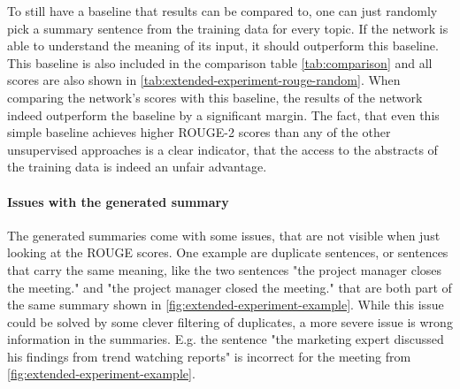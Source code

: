 To still have a baseline that results can be compared to, one can just randomly pick a summary sentence from the training data for every topic.
If the network is able to understand the meaning of its input, it should outperform this baseline.
This baseline is also included in the comparison table \cref{tab:comparison} and all scores are also shown in \cref{tab:extended-experiment-rouge-random}.
When comparing the network's scores with this baseline, the results of the network indeed outperform the baseline by a significant margin.
The fact, that even this simple baseline achieves higher ROUGE-2 scores than any of the other unsupervised approaches is a clear indicator, that the access to the abstracts of the training data is indeed an unfair advantage.

\paragraph{Issues with the generated summary}

The generated summaries come with some issues, that are not visible when just looking at the ROUGE scores.
One example are duplicate sentences, or sentences that carry the same meaning, like the two sentences "the project manager closes the meeting." and "the project manager closed the meeting." that are both part of the same summary shown in \cref{fig:extended-experiment-example}.
While this issue could be solved by some clever filtering of duplicates, a more severe issue is wrong information in the summaries.
E.g. the sentence "the marketing expert discussed his findings from trend watching reports" is incorrect for the meeting from \cref{fig:extended-experiment-example}.